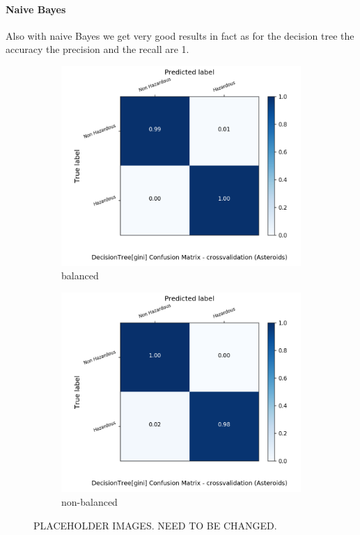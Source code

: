 \documentclass{article}
\begin{document}
\paragraph{Naive Bayes}
Also with naive Bayes we get very good results in fact as for the decision tree the accuracy the precision and the recall are 1.


\begin{figure}[H]
	\centering
	\begin{subfigure}{.5\textwidth}
		\centering
		\includegraphics[width=1.1\textwidth]{Plots/asteroids/asteroids_DecisionTree_gini_balance_True_crossvalidation.png}
		\caption{balanced}
	\end{subfigure}%
	\begin{subfigure}{.5\textwidth}
		\centering
		\includegraphics[width=1.1\textwidth]{Plots/asteroids/asteroids_DecisionTree_gini_balance_False_crossvalidation.png}
		\caption{non-balanced}
	\end{subfigure}
	\caption{{\color{red} PLACEHOLDER IMAGES. NEED TO BE CHANGED.}}
\end{figure}
\end{document}
